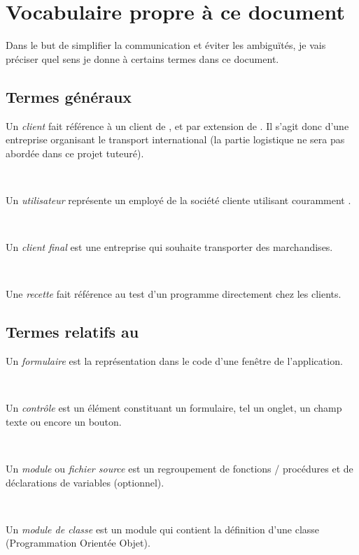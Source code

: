 \chapter{Vocabulaire propre à ce document}
Dans le but de simplifier la communication et éviter les ambiguïtés, je vais préciser quel sens je donne à certains termes dans ce document.

\section{Termes généraux}
Un \emph{client} fait référence à un client de \integrale, et par extension de \solulog. Il s'agit donc d'une entreprise organisant le transport international (la partie logistique ne sera pas abordée dans ce projet tuteuré).

~

Un \emph{utilisateur} représente un employé de la société cliente utilisant couramment \integrale.

~

Un \emph{client final} est une entreprise qui souhaite transporter des marchandises.

~

Une \emph{recette} fait référence au test d'un programme directement chez les clients.

\section{Termes relatifs au \vb}
Un \emph{formulaire} est la représentation dans le code d'une fenêtre de l'application.

~

Un \emph{contrôle} est un élément constituant un formulaire, tel un onglet, un champ texte ou encore un bouton.

~

Un \emph{module} ou \emph{fichier source} est un regroupement de fonctions / procédures et de déclarations de variables (optionnel).

~

Un \emph{module de classe} est un module qui contient la définition d'une classe (Programmation Orientée Objet).